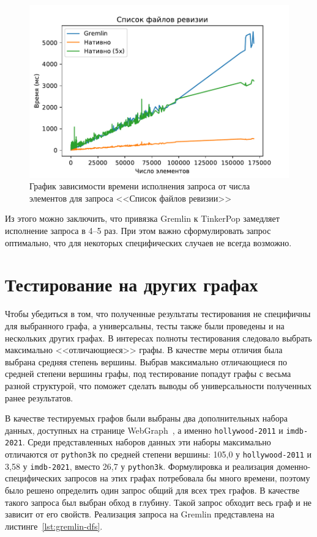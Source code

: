 \documentclass[times,specification,annotation]{itmo-student-thesis}
\begin{document}
\begin{figure}[!h]
\caption{График зависимости времени исполнения запроса от числа элементов для запроса <<Список файлов ревизии>>}\label{fig-rec2}
\centering
\includegraphics{img/rec2-plot.pdf}
\end{figure}

Из этого можно заключить, что привязка Gremlin к TinkerPop замедляет исполнение запроса в 4--5 раз. При этом важно сформулировать запрос оптимально, что для некоторых специфических случаев не всегда возможно.

\section{Тестирование на других графах}

Чтобы убедиться в том, что полученные результаты тестирования не специфичны для выбранного графа, а универсальны, тесты также были проведены и на нескольких других графах. В интересах полноты тестирования следовало выбрать максимально <<отличающиеся>> графы. В качестве меры отличия была выбрана средняя степень вершины. Выбрав максимально отличающиеся по средней степени вершины графы, под тестирование попадут графы с весьма разной структурой, что поможет сделать выводы об универсальности полученных ранее результатов.

В качестве тестируемых графов были выбраны два дополнительных набора данных, доступных на странице WebGraph~\cite{webgraph-datasets}, а именно \texttt{hollywood-2011} и \texttt{imdb-2021}. Среди представленных наборов данных эти наборы максимально отличаются от \texttt{python3k} по средней степени вершины: 105,0 у \texttt{hollywood-2011} и 3,58 у \texttt{imdb-2021}, вместо 26,7 у \texttt{python3k}. Формулировка и реализация доменно-специфических запросов на этих графах потребовала бы много времени, поэтому было решено определить один запрос общий для всех трех графов. В качестве такого запроса был выбран обход в глубину. Такой запрос обходит весь граф и не зависит от его свойств. Реализация запроса на Gremlin представлена на листинге~\ref{lst:gremlin-dfs}.
\end{document}
